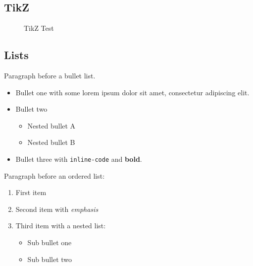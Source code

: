 \subsection{TikZ}\label{tikz}

\par\medskip

\begin{figure}[ht]
\centering
{}
\caption{TikZ Test}
\label{fig:tikz-test}
\end{figure}

\par\medskip

\subsection{Lists}\label{lists}

Paragraph before a bullet list.

\begin{itemize}
\tightlist
\item
  Bullet one with some lorem ipsum dolor sit amet, consectetur
  adipiscing elit.
\item
  Bullet two

  \begin{itemize}
  \tightlist
  \item
    Nested bullet A
  \item
    Nested bullet B
  \end{itemize}
\item
  Bullet three with \texttt{inline-code} and \textbf{bold}.
\end{itemize}

Paragraph before an ordered list:

\begin{enumerate}
\def\labelenumi{\arabic{enumi}.}
\tightlist
\item
  First item
\item
  Second item with \emph{emphasis}
\item
  Third item with a nested list:

  \begin{itemize}
  \tightlist
  \item
    Sub bullet one
  \item
    Sub bullet two
  \end{itemize}
\end{enumerate}

